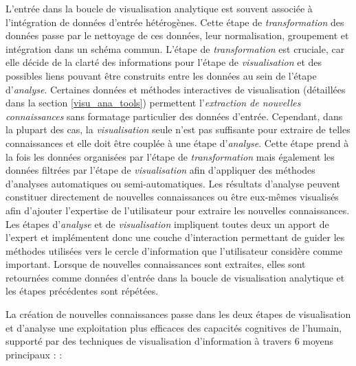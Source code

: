 L'entrée dans la boucle de visualisation analytique est souvent associée à l'intégration de données d'entrée hétérogènes. Cette étape de \textit{transformation} des données passe par le nettoyage de ces données, leur normalisation, groupement et intégration dans un schéma commun. L'étape de \textit{transformation} est cruciale, car elle décide de la clarté des informations pour l'étape de \textit{visualisation} et des possibles liens pouvant être construits entre les données au sein de l'étape d'\textit{analyse}. Certaines données et méthodes interactives de visualisation (détaillées dans la section \ref{visu_ana_tools}) permettent l'\textit{extraction de nouvelles connaissances} sans formatage particulier des données d'entrée. Cependant, dans la plupart des cas, la \textit{visualisation} seule n'est pas suffisante pour extraire de telles connaissances et elle doit être couplée à une étape d'\textit{analyse}. Cette étape prend à la fois les données organisées par l'étape de \textit{transformation} mais également les données filtrées par l'étape de \textit{visualisation} afin d'appliquer des méthodes d'analyses automatiques ou semi-automatiques. Les résultats d'analyse peuvent constituer directement de nouvelles connaissances ou être eux-mêmes visualisés afin d'ajouter l'expertise de l'utilisateur pour extraire les nouvelles connaissances. Les étapes d'\textit{analyse} et de \textit{visualisation} impliquent toutes deux un apport de l'expert et implémentent donc une couche d'interaction permettant de guider les méthodes utilisées vers le cercle d'information que l'utilisateur considère comme important. Lorsque de nouvelles connaissances sont extraites, elles sont retournées comme données d'entrée dans la boucle de visualisation analytique et les étapes précédentes sont répétées.


La création de nouvelles connaissances passe dans les deux étapes de visualisation et d'analyse une exploitation plus efficaces des capacités cognitives de l'humain, supporté par des techniques de visualisation d'information à travers 6 moyens principaux :  \cite{card1999readings,cook_illuminating_2005}:

